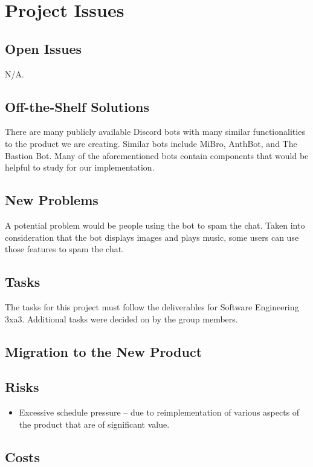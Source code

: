 \documentclass[12pt, titlepage]{article}
\begin{document}
\section{Project Issues}

\subsection{Open Issues}
N/A.

\subsection{Off-the-Shelf Solutions}

There are many publicly available Discord  bots with many similar functionalities to the product we are creating. Similar bots include MiBro, AnthBot, and The Bastion Bot. Many of the aforementioned bots contain components that would be helpful to study for our implementation.

\subsection{New Problems}
A potential problem would be people using the bot to spam the chat. Taken into consideration that the bot displays images and plays music, some users can use those features to spam the chat.

\subsection{Tasks}
The tasks for this project must follow the deliverables for Software Engineering 3xa3. Additional tasks were decided on by the group members. 

\subsection{Migration to the New Product}

\subsection{Risks}

\begin{itemize}
\item Excessive schedule pressure – due to reimplementation of various aspects of the product that are of significant value.
\end{itemize}

\subsection{Costs}
\end{document}
